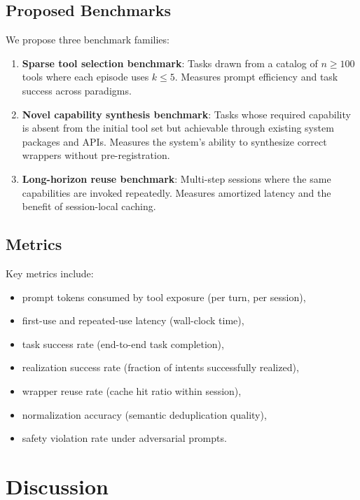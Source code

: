 \documentclass[11pt]{article}
\begin{document}
\subsection{Proposed Benchmarks}

We propose three benchmark families:

\begin{enumerate}[leftmargin=*]
  \item \textbf{Sparse tool selection benchmark}: Tasks drawn from a catalog of $n \geq 100$ tools where each episode uses $k \leq 5$. Measures prompt efficiency and task success across paradigms.

  \item \textbf{Novel capability synthesis benchmark}: Tasks whose required capability is absent from the initial tool set but achievable through existing system packages and APIs. Measures the system's ability to synthesize correct wrappers without pre-registration.

  \item \textbf{Long-horizon reuse benchmark}: Multi-step sessions where the same capabilities are invoked repeatedly. Measures amortized latency and the benefit of session-local caching.
\end{enumerate}

\subsection{Metrics}

Key metrics include:
\begin{itemize}[leftmargin=*]
  \item prompt tokens consumed by tool exposure (per turn, per session),
  \item first-use and repeated-use latency (wall-clock time),
  \item task success rate (end-to-end task completion),
  \item realization success rate (fraction of intents successfully realized),
  \item wrapper reuse rate (cache hit ratio within session),
  \item normalization accuracy (semantic deduplication quality),
  \item safety violation rate under adversarial prompts.
\end{itemize}

\section{Discussion}
\label{sec:discussion}
\end{document}
